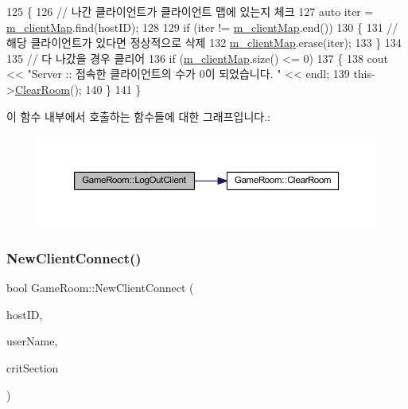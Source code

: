 \begin{DoxyCode}
125 \{
126     \textcolor{comment}{// 나간 클라이언트가 클라이언트 맵에 있는지 체크}
127     \textcolor{keyword}{auto} iter = \hyperlink{class_game_room_afc202a511605453216f7dd870ff96c5c}{m\_clientMap}.find(hostID);
128 
129     \textcolor{keywordflow}{if} (iter != \hyperlink{class_game_room_afc202a511605453216f7dd870ff96c5c}{m\_clientMap}.end())
130     \{
131         \textcolor{comment}{// 해당 클라이언트가 있다면 정상적으로 삭제}
132         \hyperlink{class_game_room_afc202a511605453216f7dd870ff96c5c}{m\_clientMap}.erase(iter);
133     \}
134     
135     \textcolor{comment}{// 다 나갔을 경우 클리어}
136     \textcolor{keywordflow}{if} (\hyperlink{class_game_room_afc202a511605453216f7dd870ff96c5c}{m\_clientMap}.size() <= 0)
137     \{
138         cout << \textcolor{stringliteral}{"Server :: 접속한 클라이언트의 수가 0이 되었습니다. "} << endl;
139         this->\hyperlink{class_game_room_a3dd806c7382efd9ffd353ab152113d69}{ClearRoom}();
140     \}
141 \}
\end{DoxyCode}
이 함수 내부에서 호출하는 함수들에 대한 그래프입니다.\+:\nopagebreak
\begin{figure}[H]
\begin{center}
\leavevmode
\includegraphics[width=350pt]{class_game_room_a4811bd3795a4f8130718bb7a9a2c4b0f_cgraph}
\end{center}
\end{figure}
\mbox{\label{class_game_room_a498a6614e5ad025ff27f15e5571f2b2d}} 
\subsubsection{\texorpdfstring{New\+Client\+Connect()}{NewClientConnect()}}
{\footnotesize\ttfamily bool Game\+Room\+::\+New\+Client\+Connect (\begin{DoxyParamCaption}\item[{Host\+ID}]{host\+ID,  }\item[{string}]{user\+Name,  }\item[{Critical\+Section \&}]{crit\+Section }\end{DoxyParamCaption})}



